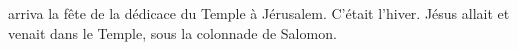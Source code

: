 \encetemps arriva la fête de la dédicace du Temple à Jérusalem.
C’était l’hiver.
Jésus allait et venait dans le Temple, sous la colonnade de Salomon.
